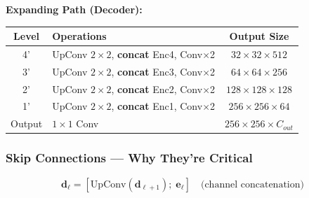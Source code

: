 \textbf{Expanding Path (Decoder):}
\begin{center}\small
\begin{tabular}{clc}\toprule
\textbf{Level} & \textbf{Operations} & \textbf{Output Size} \\\midrule
4' & UpConv $2{\times}2$, \textbf{concat} Enc4, Conv$\times$2 & $32 \times 32 \times 512$ \\
3' & UpConv $2{\times}2$, \textbf{concat} Enc3, Conv$\times$2 & $64 \times 64 \times 256$ \\
2' & UpConv $2{\times}2$, \textbf{concat} Enc2, Conv$\times$2 & $128 \times 128 \times 128$ \\
1' & UpConv $2{\times}2$, \textbf{concat} Enc1, Conv$\times$2 & $256 \times 256 \times 64$ \\
Output & $1{\times}1$ Conv & $256 \times 256 \times C_{out}$ \\
\bottomrule
\end{tabular}
\end{center}

\subsubsection{Skip Connections — Why They're Critical}
$$\mathbf{d}_\ell = [\text{UpConv}(\mathbf{d}_{\ell+1});\; \mathbf{e}_\ell] \quad \text{(channel concatenation)}$$

